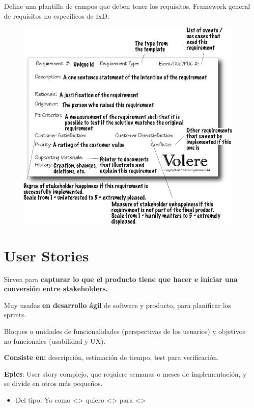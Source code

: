 \documentclass[12pt]{report} %
\begin{document}
Define una plantilla de campos que deben tener los requisitos. Framework
general de requisitos no específicos de IxD.
\begin{figure}[H]
	{\includegraphics[scale=.4]{2_9_volere_snow_card_alt.jpg}}
\end{figure}

\section{User Stories}

Sirven para \textbf{capturar lo que el producto tiene que hacer e iniciar
una conversión entre stakeholders.}

Muy usadas \textbf{en desarrollo ágil} de software y producto, para
planificar los sprints.

Bloques o unidades de funcionalidades (perspectivas de los usuarios) y
objetivos no funcionales (usabilidad y UX).

\textbf{Consiste en:} descripción, estimación de tiempo, test para
verificación.

\textbf{Epics}: User story complejo, que requiere semanas o meses de
implementación, y se divide en otros más pequeños.

\begin{itemize}

\item
  Del tipo: Yo como \textless\textgreater{} quiero
  \textless\textgreater{} para \textless\textgreater{}
\end{itemize}
\end{document}
